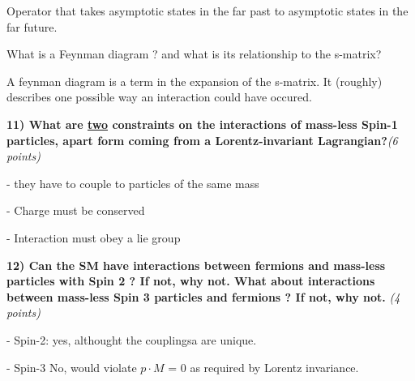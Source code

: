 {Operator that takes asymptotic states in the far past to asymptotic states in the far future. 

\item[b)]What is a Feynman diagram ? and what is its relationship to the s-matrix?

A feynman diagram is a term in the expansion of the s-matrix.  It (roughly) describes one possible way an interaction could have occured.

\ei

\vspace*{0.3in}
\textbf{11) What are \underline{two} constraints on the interactions of mass-less Spin-1 particles, apart form coming from a Lorentz-invariant Lagrangian?}\hfill \textit{(6 points)}

- they have to couple to particles of the same mass

- Charge must be conserved

- Interaction must obey a lie group


\vspace*{0.3in}
\textbf{12) Can the SM have interactions between fermions and mass-less particles with Spin 2 ? If not, why not.  What about interactions between mass-less Spin 3 particles and fermions ? If not, why not. }\hfill \textit{(4 points)}

- Spin-2: yes, althought the couplingsa are unique.

- Spin-3 No, would violate $p\cdot M$ = 0 as required by Lorentz invariance. 


%
%
%



}
